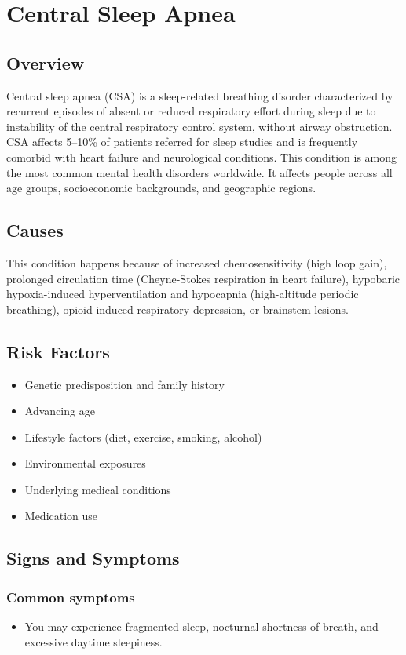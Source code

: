 \chapter{Central Sleep Apnea}
\label{sec:Central Sleep Apnea}

\section{Overview}
Central sleep apnea (CSA) is a sleep-related breathing disorder characterized by recurrent episodes of absent or reduced respiratory effort during sleep due to instability of the central respiratory control system, without airway obstruction. CSA affects 5--10\% of patients referred for sleep studies and is frequently comorbid with heart failure and neurological conditions. This condition is among the most common mental health disorders worldwide. It affects people across all age groups, socioeconomic backgrounds, and geographic regions.
\section{Causes}
This condition happens because of increased chemosensitivity (high loop gain), prolonged circulation time (Cheyne-Stokes respiration in heart failure), hypobaric hypoxia-induced hyperventilation and hypocapnia (high-altitude periodic breathing), opioid-induced respiratory depression, or brainstem lesions.     
\section{Risk Factors}

\begin{itemize}[noitemsep]
  \item Genetic predisposition and family history
  \item Advancing age
  \item Lifestyle factors (diet, exercise, smoking, alcohol)
  \item Environmental exposures
  \item Underlying medical conditions
  \item Medication use
\end{itemize}
\section{Signs and Symptoms}

\subsection{Common symptoms}
\begin{itemize}[noitemsep]
  \item You may experience fragmented sleep, nocturnal shortness of breath, and excessive daytime sleepiness. 
  \end{itemize}

